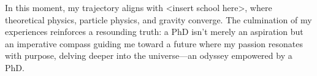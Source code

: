 \documentclass[a4paper, 12pt]{../../config/homework}
\begin{document}
In this moment, my trajectory aligns with <insert school here>, where theoretical physics, particle physics, and gravity converge. The culmination of my experiences reinforces a resounding truth: a PhD isn’t merely an aspiration but an imperative compass guiding me toward a future where my passion resonates with purpose, delving deeper into the universe—an odyssey empowered by a PhD.
\end{document}

